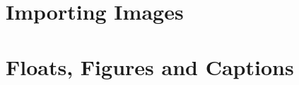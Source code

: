 

\section{Importing Images} %
\label{sec:importing_images}



\section{Floats, Figures and Captions} %
\label{sec:floats_figures_and_captions}

%
%
%
%
	
